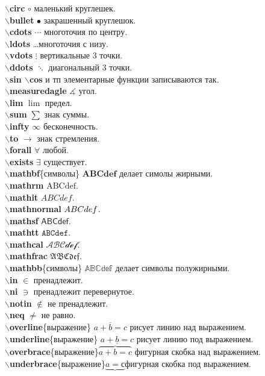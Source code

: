\documentclass{article}
\newcommand{\bs}{$\backslash$}
\newcommand{\bd}[1]{{\bfseries #1}} %
\newcommand{\bb}[1]{\bd{\bs #1}} %
\begin{document}
\bb{circ} $\circ$ маленький круглешек.\\
\bb{bullet} $\bullet$ закрашенный круглешок.\\
\bb{cdots} $\cdots$ многоточия по центру.\\
\bb{ldots} \ldots многоточия с низу.\\
\bb{vdots} $\vdots$ вертикальные 3 точки.\\
\bb{ddots} $\ddots$ диагональный 3 точки.\\
\bb{sin \bs cos} и тп элементарные функции записываются так.\\
\bb{measuredagle} $\measuredangle$ угол.\\
\bb{lim} $\lim$ предел.\\
\bb{sum} $\sum$ знак суммы.\\
\bb{infty} $\infty$ бесконечность.\\
\bb{to} $\to$ знак стремления.\\
\bb{forall} $\forall$ любой.\\
\bb{exists} $\exists$ существует.\\
\bb{mathbf}\{символы\} $\mathbf{ABCdef}$ делает симолы жирными.\\
\bb{mathrm} $\mathrm{ABCdef}$.\\
\bb{mathit} $\mathit{ABCdef}$.\\
\bb{mathnormal} $\mathnormal{ABCdef}$.\\
\bb{mathsf} $\mathsf{ABCdef}$.\\
\bb{mathtt} $\mathtt{ABCdef}$.\\
\bb{mathcal} $\mathcal{ABCdef}$.\\
\bb{mathfrac} $\mathfrak{ABCdef}$.\\
\bb{mathbb}\{символы\} $\mathbb{ABCdef}$ делает символы полужирными.\\
\bb{in} $\in$ пренадлежит.\\
\bb{ni} $\ni$ пренадлежит перевернутое.\\
\bb{notin} $\notin$ не пренадлежит.\\
\bb{neq} $\neq$ не равно.\\
\bb{overline}\{выражение\} $\overline{a+b=c}$ рисует линию над выражением.\\
\bb{underline}\{выражение\} $\underline{a+b=c}$ рисует линию под выражением.\\
\bb{overbrace}\{выражение\}$\overbrace{a+b=c}$ фигурная скобка над выражением.\\
\bb{underbrace}\{выражение\}$\underbrace{a=с}$фигурная скобка под выражением.\\
\end{document}

